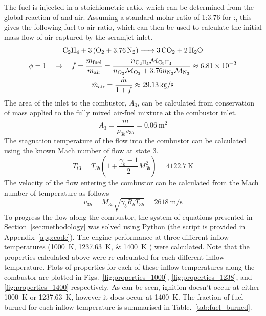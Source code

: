 \documentclass[a4paper]{article}
\begin{document}
The fuel is injected in a stoichiometric ratio, which can be determined from the global reaction of  and air. Assuming a standard molar ratio of 1:3.76 for :, this gives the following fuel-to-air ratio, which can then be used to calculate the initial mass flow of air captured by the scramjet inlet.  
\begin{gather}
    \ce{C2H4 + 3(O2 + 3.76N2) -> 3CO2 + 2H2O} \\
    \phi = 1 \quad \rightarrow 
    \quad f = \frac{m_\text{fuel}}{m_\text{air}} 
    = \frac{
        n_{\ce{C2H4}} \mathcal{M}_{\ce{C2H4}}
    }{
        n_{\ce{O2}} \mathcal{M}_{\ce{O2}} + 3.76 n_{\ce{N2}} \mathcal{M}_{\ce{N2}}
    }
    \approx \num{6.81e-2} \\
    \dot{m}_\text{air} = \frac{\dot{m}}{1 + f} \approx \SI{29.13}{\kg\per\s}
\end{gather}
The area of the inlet to the combustor, \(A_3\), can be calculated from conservation of mass applied to the fully mixed air-fuel mixture at the combustor inlet.
\begin{equation}
    A_3 = \frac{\dot{m}}{\rho_{3b} v_{3b}} = \SI{0.06}{\m\squared}
\end{equation}
The stagnation temperature of the flow into the combustor can be calculated using the known Mach number of flow at state 3.
\begin{equation}
    T_{t3} = T_{3b} \left(1 +\frac{\gamma_b - 1 }{2}M_{3b}^2\right) = \SI{4122.7}{\K}
\end{equation}
The velocity of the flow entering the combustor can be calculated from the Mach number of temperature as follows
\begin{equation}
    v_{3b} = M_{3b} \sqrt{\gamma_b R_b T_{3b}} = \SI{2618}{\m\per\s}
\end{equation}
To progress the flow along the combustor, the system of equations presented in Section~\ref{sec:methodology} was solved using Python (the script is provided in Appendix~\ref{app:code}). The engine performance at three different inflow temperatures (\SIlist{1000;1237.63;1400}{\K} ) were calculated. Note that the properties calculated above were re-calculated for each different inflow temperature. Plots of properties for each of these inflow temperatures along the combustor are plotted in Figs.~\ref{fig:properties_1000}, \ref{fig:properties_1238}, and \ref{fig:properties_1400} respectively. As can be seen, ignition doesn't occur at either \SI{1000}{\K} or \SI{1237.63}{\K}, however it does occur at \SI{1400}{\K}. The fraction of fuel burned for each inflow temperature is summarised in Table.~\ref{tab:fuel_burned}.
\end{document}
